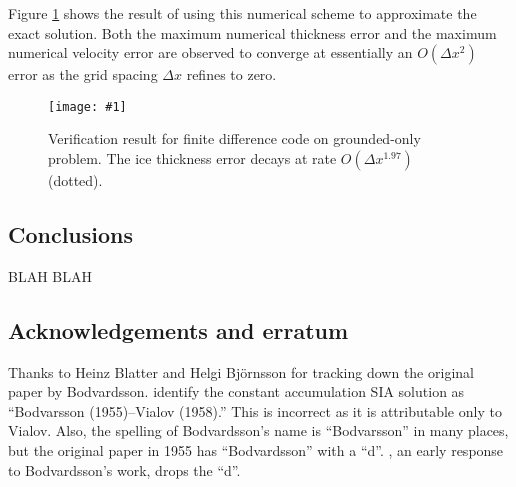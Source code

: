 \documentclass[twocolumn,letterpaper]{igs}
\newcommand{\onecol}[1]{\texttt{[image: \#1]}}
\begin{document}
Figure \ref{fig:verifNresult} shows the result of using this numerical scheme to approximate the exact solution.  Both the maximum numerical thickness error and the maximum numerical velocity error are observed to converge at essentially an $O(\Delta x^2)$ error as the grid spacing $\Delta x$ refines to zero.  

\begin{figure}[ht]
\onecol{verifN}
\caption{Verification result for finite difference code on grounded-only problem.  The ice thickness error decays at rate $O(\Delta x^{1.97})$ (dotted).} \label{fig:verifNresult}
\end{figure}


\subsection*{Conclusions} BLAH BLAH

\subsection*{Acknowledgements and erratum}  Thanks to Heinz Blatter and Helgi Bj\"ornsson for tracking down the original paper by Bodvardsson.  \cite{BLKCB} identify the constant accumulation SIA solution as ``Bodvarsson (1955)--Vialov (1958).''  This is incorrect as it is attributable only to Vialov.  Also, the spelling of Bodvardsson's name is ``Bodvarsson'' in many places, but the original paper in 1955 has ``Bodvardsson'' with a ``d''.  \cite{Weertman61stability}, an early response to Bodvardsson's work, drops the ``d''.





\appendix
\end{document}
